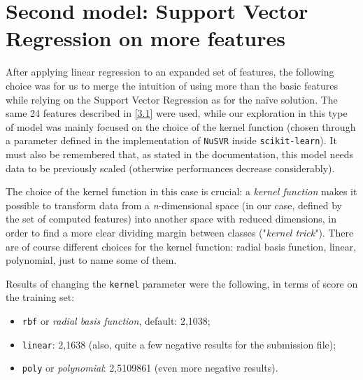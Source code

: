 \section[Second model]{Second model: Support Vector Regression on more features}
\label{3.2}
After applying linear regression to an expanded set of features, the following choice was for us to merge the intuition of using more than the basic features while relying on the Support Vector Regression as for the na{\"i}ve solution. The same 24 features described in \ref{3.1} were used, while our exploration in this type of model was mainly focused on the choice of the kernel function (chosen through a parameter defined in the implementation of \texttt{NuSVR} inside \texttt{scikit-learn}). It must also be remembered that, as stated in the documentation, this model needs data to be previously scaled (otherwise performances decrease considerably).

The choice of the kernel function in this case is crucial: a \textit{kernel function} makes it possible to transform data from a \textit{n}-dimensional space (in our case, defined by the set of computed features) into another space with reduced dimensions, in order to find a more clear dividing margin between classes ("\textit{kernel trick}"). There are of course different choices for the kernel function: radial basis function, linear, polynomial, just to name some of them.

Results of changing the \texttt{kernel} parameter were the following, in terms of score on the training set:
\begin{itemize}
	\item \texttt{rbf} or \textit{radial basis function}, default: 2,1038;
	\item \texttt{linear}: 2,1638 (also, quite a few negative results for the submission file);
	\item \texttt{poly} or \textit{polynomial}: 2,5109861 (even more negative results).
\end{itemize}

